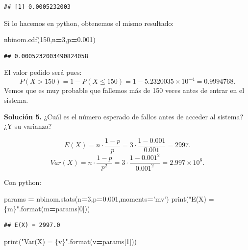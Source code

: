 \documentclass[]{book}
\newenvironment{Shaded}{\begin{snugshade}}{\end{snugshade}}
\newcommand{\BuiltInTok}[1]{#1}
\newcommand{\DecValTok}[1]{\textcolor[rgb]{0.00,0.00,0.81}{#1}}
\newcommand{\FloatTok}[1]{\textcolor[rgb]{0.00,0.00,0.81}{#1}}
\newcommand{\NormalTok}[1]{#1}
\newcommand{\OperatorTok}[1]{\textcolor[rgb]{0.81,0.36,0.00}{\textbf{#1}}}
\newcommand{\SpecialCharTok}[1]{\textcolor[rgb]{0.00,0.00,0.00}{#1}}
\newcommand{\StringTok}[1]{\textcolor[rgb]{0.31,0.60,0.02}{#1}}
\begin{document}
\begin{verbatim}
## [1] 0.0005232003
\end{verbatim}

Si lo hacemos en python, obtenemos el mismo resultado:

\begin{Shaded}
\begin{Highlighting}[]
\NormalTok{nbinom.cdf(}\DecValTok{150}\NormalTok{,n}\OperatorTok{=}\DecValTok{3}\NormalTok{,p}\OperatorTok{=}\FloatTok{0.001}\NormalTok{)}
\end{Highlighting}
\end{Shaded}

\begin{verbatim}
## 0.0005232003490824058
\end{verbatim}

El valor pedido será pues:
\[
P(X>150)=1-P(X\leq 150)=1-\ensuremath{5.2320035\times 10^{-4}}=0.9994768.
\]
Vemos que es muy probable que fallemos más de 150 veces antes de entrar en el sistema.

\textbf{Solución 5.} ¿Cuál es el número esperado de fallos antes de acceder al sistema? ¿Y su varianza?

\[E(X)=n\cdot \frac{1-p}{p}=3\cdot \frac{1- 0.001}{0.001}=2997.\]
\[Var(X)=n\cdot \frac{1-p}{p^2}=3\cdot \frac{1- 0.001^2}{0.001^2}=\ensuremath{2.997\times 10^{6}}.\]

Con python:

\begin{Shaded}
\begin{Highlighting}[]
\NormalTok{params }\OperatorTok{=}\NormalTok{ nbinom.stats(n}\OperatorTok{=}\DecValTok{3}\NormalTok{,p}\OperatorTok{=}\FloatTok{0.001}\NormalTok{,moments}\OperatorTok{=}\StringTok{'mv'}\NormalTok{)}
\BuiltInTok{print}\NormalTok{(}\StringTok{"E(X) = }\SpecialCharTok{\{m\}}\StringTok{"}\NormalTok{.}\BuiltInTok{format}\NormalTok{(m}\OperatorTok{=}\NormalTok{params[}\DecValTok{0}\NormalTok{]))}
\end{Highlighting}
\end{Shaded}

\begin{verbatim}
## E(X) = 2997.0
\end{verbatim}

\begin{Shaded}
\begin{Highlighting}[]
\BuiltInTok{print}\NormalTok{(}\StringTok{"Var(X) = }\SpecialCharTok{\{v\}}\StringTok{"}\NormalTok{.}\BuiltInTok{format}\NormalTok{(v}\OperatorTok{=}\NormalTok{params[}\DecValTok{1}\NormalTok{]))}
\end{Highlighting}
\end{Shaded}
\end{document}
